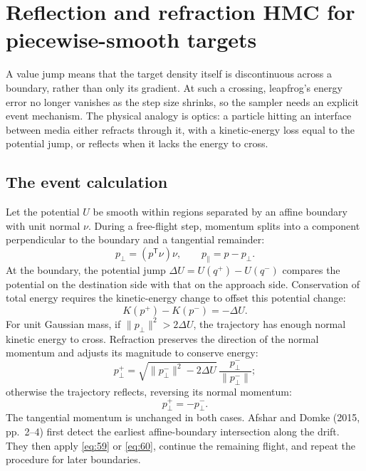 \documentclass[11pt]{article}
\begin{document}
\section{Reflection and refraction HMC for piecewise-smooth targets}\label{sec:event}

A value jump means that the target density itself is discontinuous across a
boundary, rather than only its gradient. At such a crossing, leapfrog's energy
error no longer vanishes as the step size shrinks, so the sampler needs an
explicit event mechanism. The physical analogy is optics: a particle hitting
an interface between media either refracts through it, with a kinetic-energy
loss equal to the potential jump, or reflects when it lacks the energy to
cross.

\subsection{The event calculation}\label{sec:event-calc}

Let the potential $U$ be smooth within regions separated by an affine
boundary with unit normal $\nu$. During a free-flight step, momentum
splits into a component perpendicular to the boundary and a tangential
remainder:
\begin{equation}\label{eq:57}
 p_\perp=(p^{\mathsf T}\nu)\nu,
 \qquad p_\parallel=p-p_\perp.
\end{equation}
At the boundary, the potential jump $\Delta U=U(q^+)-U(q^-)$ compares the potential on
the destination side with that on the approach side. Conservation of total
energy requires the kinetic-energy change to offset this potential change:
\begin{equation}\label{eq:58}
 K(p^+)-K(p^-)=-\Delta U.
\end{equation}
For unit Gaussian mass, if $\|p_\perp\|^2>2\Delta U$, the trajectory has enough normal
kinetic energy to cross. Refraction preserves the direction of the normal
momentum and adjusts its magnitude to conserve energy:
\begin{equation}\label{eq:59}
 p_\perp^+=
 \sqrt{\|p_\perp^-\|^2-2\Delta U}\,
 \frac{p_\perp^-}{\|p_\perp^-\|};
\end{equation}
otherwise the trajectory reflects, reversing its normal momentum:
\begin{equation}\label{eq:60}
 p_\perp^+=-p_\perp^-.
\end{equation}
The tangential momentum is unchanged in both cases. Afshar and Domke (2015,
pp.~2--4) first detect the earliest affine-boundary intersection along
the drift. They then apply \eqref{eq:59} or \eqref{eq:60}, continue the remaining
flight, and repeat the procedure for later boundaries.
\end{document}
